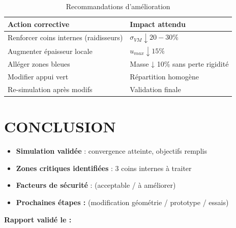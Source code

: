 \documentclass[12pt,a4paper]{article}
\begin{document}
						\begin{table}[H]
							\centering
							\begin{tabular}{p{6cm}p{6cm}}
								\toprule
								\textbf{Action corrective} & \textbf{Impact attendu} \\
								\midrule
								Renforcer coins internes (raidisseurs) & $\sigma_{VM} ↓ 20-30\%$ \\
								Augmenter épaisseur locale & $u_{max} ↓ 15\%$ \\
								Alléger zones bleues & Masse ↓ 10\% sans perte rigidité \\
								Modifier appui vert & Répartition homogène \\
								Re-simulation après modifs & Validation finale \\
								\bottomrule
							\end{tabular}
							\caption{Recommandations d'amélioration}
						\end{table}
			
			
			
			
			
			
	\newpage
	
	
	
	
	
	
	\section{CONCLUSION}
	
			\begin{itemize}
				\item \textbf{Simulation validée} : convergence atteinte, objectifs remplis
				\item \textbf{Zones critiques identifiées} : 3 coins internes à traiter
				\item \textbf{Facteurs de sécurité} : \dotfill (acceptable / à améliorer)
				\item \textbf{Prochaines étapes :} \dotfill (modification géométrie / prototype / essais)
			\end{itemize}
			
			\vspace{1cm}
			\begin{center}
				\textbf{Rapport validé le : \dotfill}
			\end{center}
	
\end{document}
